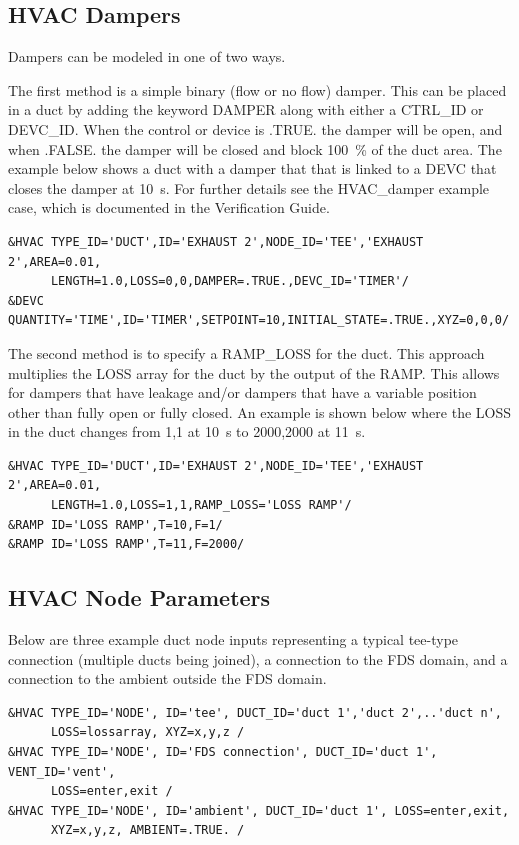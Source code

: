 \documentclass[11pt]{book}
\begin{document}
\subsection{HVAC Dampers}
\label{info:HVACdamper}

Dampers can be modeled in one of two ways.

The first method is a simple binary (flow or no flow) damper. This can be placed in a duct by adding the keyword {\ct DAMPER} along with either a {\ct CTRL\_ID} or {\ct DEVC\_ID}.  When the control or device is {\ct .TRUE.} the damper will be open, and when {\ct .FALSE.} the damper will be closed and block 100~\% of the duct area.  The example below shows a duct with a damper that that is linked to a {\ct DEVC} that closes the damper at 10~s. For further details see the {\ct HVAC\_damper} example case, which is documented in the
Verification Guide.

\begin{lstlisting}
&HVAC TYPE_ID='DUCT',ID='EXHAUST 2',NODE_ID='TEE','EXHAUST 2',AREA=0.01,
      LENGTH=1.0,LOSS=0,0,DAMPER=.TRUE.,DEVC_ID='TIMER'/
&DEVC QUANTITY='TIME',ID='TIMER',SETPOINT=10,INITIAL_STATE=.TRUE.,XYZ=0,0,0/
\end{lstlisting}

The second method is to specify a {\ct RAMP\_LOSS} for the duct. This approach multiplies the {\ct LOSS} array for the duct by the output of the {\ct RAMP}. This allows for dampers that have leakage and/or dampers that have a variable position other than fully open or fully closed. An example is shown below where the {\ct LOSS} in the duct changes from 1,1 at 10~s to 2000,2000 at 11~s.

\begin{lstlisting}
&HVAC TYPE_ID='DUCT',ID='EXHAUST 2',NODE_ID='TEE','EXHAUST 2',AREA=0.01,
      LENGTH=1.0,LOSS=1,1,RAMP_LOSS='LOSS RAMP'/
&RAMP ID='LOSS RAMP',T=10,F=1/
&RAMP ID='LOSS RAMP',T=11,F=2000/
\end{lstlisting}


\subsection{HVAC Node Parameters}
\label{info:HVACnode}

Below are three example duct node inputs representing a typical tee-type connection (multiple ducts being joined), a connection to the FDS domain, and a connection to the ambient outside the FDS domain.

\begin{lstlisting}
&HVAC TYPE_ID='NODE', ID='tee', DUCT_ID='duct 1','duct 2',..'duct n',
      LOSS=lossarray, XYZ=x,y,z /
&HVAC TYPE_ID='NODE', ID='FDS connection', DUCT_ID='duct 1', VENT_ID='vent',
      LOSS=enter,exit /
&HVAC TYPE_ID='NODE', ID='ambient', DUCT_ID='duct 1', LOSS=enter,exit,
      XYZ=x,y,z, AMBIENT=.TRUE. /
\end{lstlisting}
\end{document}
